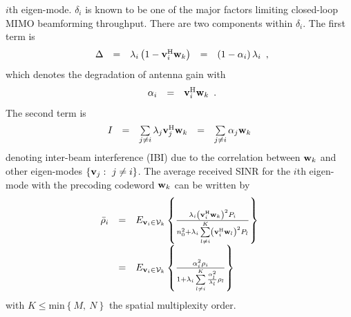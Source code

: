 \documentclass[conference]{IEEEtran}
\newcommand{\bv}{{\bf v}}
\newcommand{\bw}{{\bf w}}
\begin{document}
$i$th eigen-mode. $\delta_{i}$ is known to be one of the major
factors limiting closed-loop MIMO beamforming throughput. There
are two components within $\delta_{i}$. The first term is
\begin{equation}
\begin{array}{rcccl}
\Delta&=&\lambda_{i}\left(1-\bv_{i}^{\rm
H}\bw_k\right)&=&\left(1-\alpha_{i}\right)\lambda_{i}
\end{array},
\end{equation}
\noindent which denotes the degradation of antenna gain with
\begin{equation}
\begin{array}{rcl}
\alpha_{i}&=&\bv_{i}^{\rm H}\bw_k
\end{array}.\label{alpha}
\end{equation}
\noindent The second term is
\begin{equation}
\begin{array}{rcccl}
I_{} & = & \sum\limits_{j\neq i}\lambda_{j}\bv_{j}^{\rm
H}\bw_{k}&=&\sum\limits_{j\neq i}\alpha_{j}\bw_{k}
\end{array}\label{IBI}
\end{equation}
\noindent denoting inter-beam interference (IBI) due to the
correlation between $\bw_{k}$ and other eigen-modes
$\left\{\bv_{j}:\ j\neq i\right\}$. The average received SINR for
the $i$th eigen-mode with the precoding codeword $\bw_{k}$ can be
written by
\begin{equation}
\begin{array}{rcl}
\bar\rho_{i}&=&\mbox{E}_{\bv_{i}\in{\cal
V}_{k}}\left\{\frac{\lambda_{i}\left(\bv_{i}^{\rm
H}\bw_{k}\right)^2P_{i}}{n_{0}^2+ \lambda_{i}\sum\limits_{l\neq
i}^{K}\left(\bv_{i}^{\rm H}\bw_{l}\right)^{2}P_{l}}\right\}\\
&=&\mbox{E}_{\bv_{i}\in{\cal
V}_{k}}\left\{\frac{\alpha_{i}^{2}\rho_{i}}{1+
\lambda_{i}\sum\limits_{l\neq
i}^{K}\frac{\alpha_{l}^{2}}{\lambda_{l}}\rho_{l}}\right\}
\end{array}\label{bar_rho}
\end{equation}
\noindent with $K\leq\mbox{min}\left\{M,\ N\right\}$ the spatial
multiplexity order.
\end{document}
